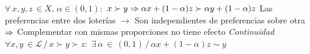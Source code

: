 \documentclass{nuevotema}
\begin{document}
\begin{esquemal}
				\4[] $\forall \, x, y, z \, \in X, \, \alpha \in (0,1):$
				\4[] $x \succ y \Rightarrow \alpha x + (1-\alpha) z \succ \alpha y + (1-\alpha) z$
				\4[] Las preferencias entre dos loterías
				\4[] $\to$ Son independientes de preferencias sobre otra
				\4[] $\Rightarrow$ Complementar con mismas proporciones no tiene efecto
				\4[Axioma IV] \textit{Continuidad}
				\4[] $\forall x, y \, \in \mathcal{L} \, / \, x \succ y \succ z:$
				\4[] $\exists \, \alpha \, \in \, (0,1) \, / \, \alpha x + (1-\alpha) z \sim y$
                
%                	
%
            

\end{esquemal}
\end{document}
